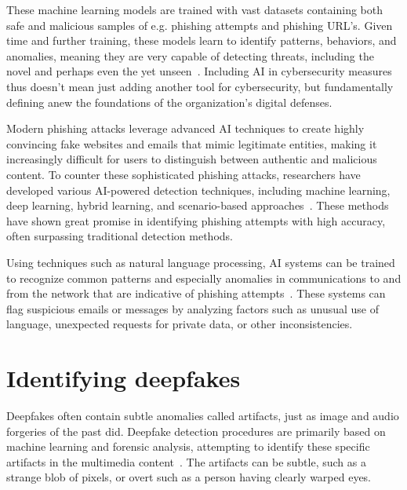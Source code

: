 These machine learning models are trained with vast datasets containing both safe and malicious samples of e.g. phishing attempts and phishing URL's. Given time and further training, these models learn to identify patterns, behaviors, and anomalies, meaning they are very capable of detecting threats, including the novel and perhaps even the yet unseen~\citep{fakhouri_AI_Driven_Solutions_SE_Attacks_2024}. Including AI in cybersecurity measures thus doesn't mean just adding another tool for cybersecurity, but fundamentally defining anew the foundations of the organization’s digital defenses.

Modern phishing attacks leverage advanced AI techniques to create highly convincing fake websites and emails that mimic legitimate entities, making it increasingly difficult for users to distinguish between authentic and malicious content. To counter these sophisticated phishing attacks, researchers have developed various AI-powered detection techniques, including machine learning, deep learning, hybrid learning, and scenario-based approaches~\citep{basit_Comprehensive_Survey_AI_Phishing_Detection_2021}. These methods have shown great promise in identifying phishing attempts with high accuracy, often surpassing traditional detection methods.

Using techniques such as natural language processing, AI systems can be trained to recognize common patterns and especially anomalies in communications to and from the network that are indicative of phishing attempts~\citep{basit_Comprehensive_Survey_AI_Phishing_Detection_2021}. These systems can flag suspicious emails or messages by analyzing factors such as unusual use of language, unexpected requests for private data, or other inconsistencies.




\section{Identifying deepfakes}
\begin{comment}
\end{comment}
Deepfakes often contain subtle anomalies called artifacts, just as image and audio forgeries of the past did. Deepfake detection procedures are primarily based on machine learning and forensic analysis, attempting to identify these specific artifacts in the multimedia content~\citep{mirsky_Creation_Detection_Deepfakes_2021}. The artifacts can be subtle, such as a strange blob of pixels, or overt such as a person having clearly warped eyes.

